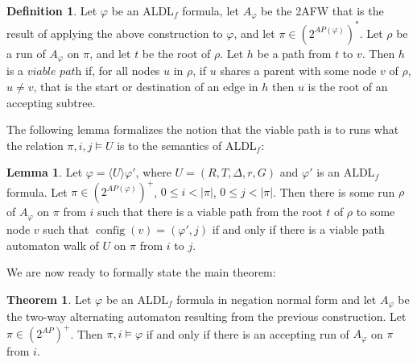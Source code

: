 \documentclass[10pt,a4paper]{amsart}
\theoremstyle{plain}
\theoremstyle{definition}
\newtheorem{theorem}[thm]{Theorem}
\newtheorem{lemma}[thm]{Lemma}
\newtheorem{definition}[thm]{Definition}
\theoremstyle{definition}
\newcommand{\dbox}[1]{\langle #1 \rangle}
\DeclareMathOperator{\config}{config}
\DeclareMathOperator{\?}{?}
\begin{document}
\begin{definition}\label{def:viable_path}
  Let $\varphi$ be an ALDL$_f$ formula, let $A_\varphi$ be the 2AFW that is the result of applying
  the above construction to $\varphi$, and let $\pi \in (2^{AP(\varphi)})^*$. Let $\rho$ be a run of
  $A_\varphi$ on $\pi$, and let $t$ be the root of $\rho$. Let $h$
  be a path from $t$ to $v$. Then $h$ is a $\textit{viable path}$ if, for all nodes $u$ in $\rho$,
  if $u$ shares a parent with some node $v$ of $\rho$, $u \neq v$, that is the start or destination of an edge in $h$ then $u$ is the
  root of an accepting subtree.
\end{definition}

The following lemma formalizes the notion that the viable path is to runs what the relation
$\pi,i,j \models U$ is to the semantics of ALDL$_f$:

\begin{lemma}\label{lem:vpath_iff_vwalk}
    Let $\varphi = \dbox{U}\varphi'$, where $U = (R,T,\Delta,r,G)$ and $\varphi'$ is
    an ALDL$_f$ formula. Let $\pi \in (2^{AP(\varphi)})^+$, $0 \leq i < |\pi|$, $0 \leq j < |\pi|$.
    Then there is some run $\rho$ of $A_{\varphi}$ on $\pi$ from $i$ such that there is a viable path
    from the root $t$ of $\rho$ to some node $v$ such that $\config(v) = (\varphi',j)$ if and only if
    there is a viable path automaton walk of $U$ on $\pi$ from $i$ to $j$.
\end{lemma}

We are now ready to formally state the main theorem:

\begin{theorem}\label{thm:aldlf_2afw_equiv}
  Let $\varphi$
  be an ALDL$_f$ formula in negation normal form and let $A_\varphi$ be the two-way alternating
  automaton resulting from the previous construction. Let $\pi \in (2^{AP})^+$. Then $\pi,i
  \models \varphi$ if and only if there is an accepting run of $A_\varphi$ on $\pi$ from $i$. 
\end{theorem}
\end{document}
